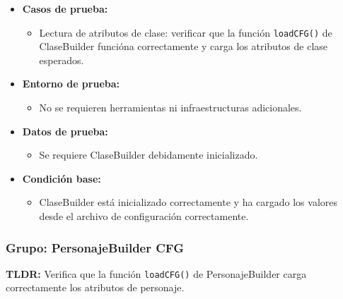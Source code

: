 \documentclass{article}
\begin{document}
\begin{itemize}
	\item \textbf{Casos de prueba:}
	\begin{itemize}
		\item Lectura de atributos de clase: verificar que la función \texttt{loadCFG()} de ClaseBuilder funcióna correctamente y carga los atributos de clase esperados.
	\end{itemize}
	
	\item \textbf{Entorno de prueba:}
	\begin{itemize}
		\item No se requieren herramientas ni infraestructuras adicionales.
	\end{itemize}
	
	\item \textbf{Datos de prueba:}
	\begin{itemize}
		\item Se requiere ClaseBuilder debidamente inicializado.
	\end{itemize}
	
	\item \textbf{Condición base:}
	\begin{itemize}
		\item ClaseBuilder está inicializado correctamente y ha cargado los valores desde el archivo de configuración correctamente.
	\end{itemize}
\end{itemize}


\subsubsection{Grupo: PersonajeBuilder CFG}
\textbf{TLDR:} Verifica que la función \texttt{loadCFG()} de PersonajeBuilder carga correctamente los atributos de personaje.
\end{document}
